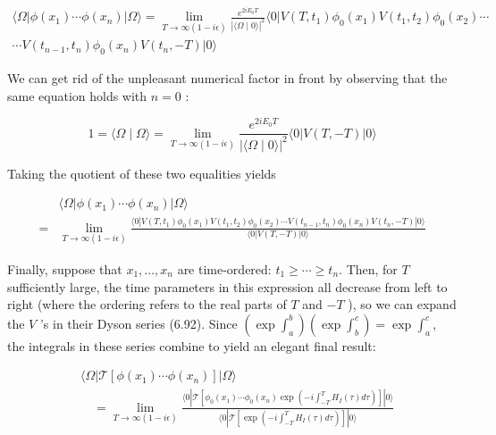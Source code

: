 \documentclass[10pt, letterpaper]{article}
\begin{document}
$$
\begin{array}{r}
\langle\Omega| \phi\left(x_{1}\right) \cdots \phi\left(x_{n}\right)|\Omega\rangle=\lim _{T \rightarrow \infty(1-i \epsilon)} \frac{e^{2 i E_{0} T}}{|\langle\Omega \mid 0\rangle|^{2}}\langle 0| V\left(T, t_{1}\right) \phi_{0}\left(x_{1}\right) V\left(t_{1}, t_{2}\right) \phi_{0}\left(x_{2}\right) \cdots \\
\cdots V\left(t_{n-1}, t_{n}\right) \phi_{0}\left(x_{n}\right) V\left(t_{n},-T\right)|0\rangle
\end{array}
$$

We can get rid of the unpleasant numerical factor in front by observing that the same equation holds with $n=0$ :

$$
1=\langle\Omega \mid \Omega\rangle=\lim _{T \rightarrow \infty(1-i \epsilon)} \frac{e^{2 i E_{0} T}}{|\langle\Omega \mid 0\rangle|^{2}}\langle 0| V(T,-T)|0\rangle
$$

Taking the quotient of these two equalities yields

$$
\begin{aligned}
& \langle\Omega| \phi\left(x_{1}\right) \cdots \phi\left(x_{n}\right)|\Omega\rangle \\
= & \lim _{T \rightarrow \infty(1-i \epsilon)} \frac{\langle 0| V\left(T, t_{1}\right) \phi_{0}\left(x_{1}\right) V\left(t_{1}, t_{2}\right) \phi_{0}\left(x_{2}\right) \cdots V\left(t_{n-1}, t_{n}\right) \phi_{0}\left(x_{n}\right) V\left(t_{n},-T\right)|0\rangle}{\langle 0| V(T,-T)|0\rangle}
\end{aligned}
$$

Finally, suppose that $x_{1}, \ldots, x_{n}$ are time-ordered: $t_{1} \geq \cdots \geq t_{n}$. Then, for $T$ sufficiently large, the time parameters in this expression all decrease from left to right (where the ordering refers to the real parts of $T$ and $-T$ ), so we can expand\\
the $V$ 's in their Dyson series (6.92). Since $\left(\exp \int_{a}^{b}\right)\left(\exp \int_{b}^{c}\right)=\exp \int_{a}^{c}$, the integrals in these series combine to yield an elegant final result:

$$
\begin{aligned}
& \langle\Omega| \mathcal{T}\left[\phi\left(x_{1}\right) \cdots \phi\left(x_{n}\right)\right]|\Omega\rangle \\
& \quad=\lim _{T \rightarrow \infty(1-i \epsilon)} \frac{\langle 0| \mathcal{T}\left[\phi_{0}\left(x_{1}\right) \cdots \phi_{0}\left(x_{n}\right) \exp \left(-i \int_{-T}^{T} H_{I}(\tau) d \tau\right)\right]|0\rangle}{\langle 0| \mathcal{T}\left[\exp \left(-i \int_{-T}^{T} H_{I}(\tau) d \tau\right)\right]|0\rangle}
\end{aligned}
$$
\end{document}
